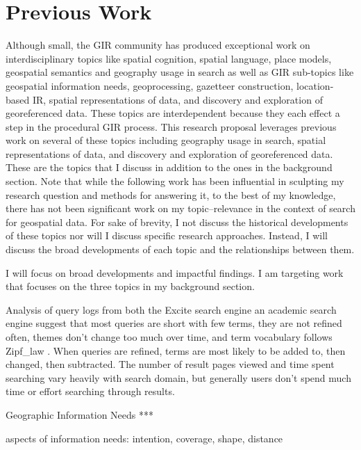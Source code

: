 \chapter{Previous Work} \label{ch:[chapter 4 label]}

Although small, the GIR community has produced exceptional work on interdisciplinary topics like spatial cognition, spatial language, place models, geospatial semantics and geography usage in search as well as GIR sub-topics like geospatial information needs, \gls{geoprocessing}, \gls{gazetteer} construction, location-based IR, spatial representations of data, and discovery and exploration of \gls{georeference}d data. These topics are interdependent because they each effect a step in the procedural GIR process. This research proposal leverages previous work on several of these topics including geography usage in search, spatial representations of data, and discovery and exploration of georeferenced data. These are the topics that I discuss in addition to the ones in the background section. Note that while the following work has been influential in sculpting my research question and methods for answering it, to the best of my knowledge, there has not been significant work on my topic–relevance in the context of search for geospatial data. For sake of brevity, I not discuss the historical developments of these topics nor will I discuss specific research approaches. Instead, I will discuss the broad developments of each topic and the relationships between them.

I will focus on broad developments and impactful findings. I am targeting work that focuses on the three topics in my background section.

Analysis of query logs from both the Excite search engine an academic search engine suggest that most queries are short with few terms, they are not refined often, themes don't change too much over time, and term vocabulary follows \gls{Zipf_law} \cite{Spink2001} \cite{Spink2002} \cite{Wang2003} \cite{Han2014}. When queries are refined, terms are most likely to be added to, then changed, then subtracted. The number of result pages viewed and time spent searching vary heavily with search domain, but generally users don't spend much time or effort searching through results.



Geographic Information Needs ***

aspects of information needs: intention, coverage, shape, distance \cite{Henrich2007}

